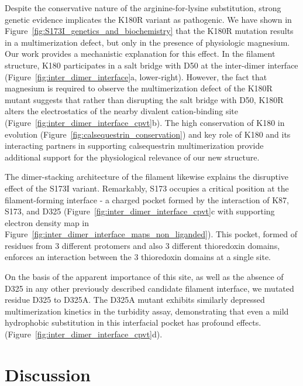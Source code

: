 Despite the conservative nature of the arginine-for-lysine substitution, strong genetic evidence implicates the K180R variant as pathogenic. We have shown in Figure~\ref{fig:S173I_genetics_and_biochemistry} that the K180R mutation results in a multimerization defect, but only in the presence of physiologic magnesium. Our work provides a mechanistic explanation for this effect. In the filament structure, K180 participates in a salt bridge with D50 at the inter-dimer interface (Figure~\ref{fig:inter_dimer_interface}a, lower-right). However, the fact that magnesium is required to observe the multimerization defect of the K180R mutant suggests that rather than disrupting the salt bridge with D50, K180R alters the electrostatics of the nearby divalent cation-binding site (Figure~\ref{fig:inter_dimer_interface_cpvt}b). The high conservation of K180 in evolution (Figure~\ref{fig:calsequestrin_conservation}) and key role of K180 and its interacting partners in supporting calsequestrin multimerization provide additional support for the physiological relevance of our new structure. 

The dimer-stacking architecture of the filament likewise explains the disruptive effect of the S173I variant. Remarkably, S173 occupies a critical position at the filament-forming interface - a charged pocket formed by the interaction of K87, S173, and D325 (Figure~\ref{fig:inter_dimer_interface_cpvt}c with supporting electron density map in Figure~\ref{fig:inter_dimer_interface_maps_non_liganded}). This pocket, formed of residues from 3 different protomers and also 3 different thioredoxin domains, enforces an interaction between the 3 thioredoxin domains at a single site.  
\begin{hlbreakable}
On the basis of the apparent importance of this site, as well as the absence of D325 in any other previously described candidate filament interface, we mutated residue D325 to D325A. The D325A mutant exhibits similarly depressed multimerization kinetics in the turbidity assay, demonstrating that even a mild hydrophobic substitution in this interfacial pocket has profound effects.
(Figure~\ref{fig:inter_dimer_interface_cpvt}d).
\end{hlbreakable}

%
%
\section{Discussion}

